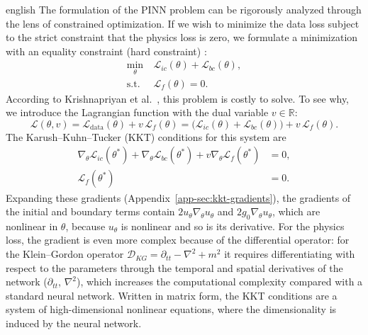 \documentclass[11pt,letterpaper,twoside,openright]{book} %
\newcommand{\Loss}{\mathcal{L}}
\begin{document}
\begin{hyphenrules}{english}
The formulation of the PINN problem can be rigorously analyzed through the lens of constrained
optimization. If we wish to minimize the data loss subject to the strict constraint that the physics
loss is zero, we formulate a minimization with an equality constraint (hard constraint)
\cite{krishnapriyan2021}:
\begin{align}
  \min_{\theta}\ &\Loss_{ic}(\theta)+\Loss_{bc}(\theta), \label{eq:hard-obj}\\
  \text{s.t. }\ &\Loss_f(\theta)=0. \label{eq:hard-constraint}
\end{align}
According to Krishnapriyan et al.~\cite{krishnapriyan2021}, this problem is costly to solve. To see why, we introduce the
Lagrangian function with the dual variable $v\in\mathbb{R}$:
\begin{equation}
  \mathscr{L}(\theta,v)=\Loss_{\mathrm{data}}(\theta)+v\,\Loss_f(\theta)
  =\big(\Loss_{ic}(\theta)+\Loss_{bc}(\theta)\big)+v\,\Loss_f(\theta).
  \label{eq:lagrangian}
\end{equation}
The Karush--Kuhn--Tucker (KKT) conditions for this system are \cite{boyd2004}
\begin{align}
  \nabla_\theta\Loss_{ic}(\theta^{*})+\nabla_\theta\Loss_{bc}(\theta^{*})+v\nabla_\theta\Loss_f(\theta^{*})&=0, \label{eq:kkt-1}\\
  \Loss_f(\theta^{*})&=0. \label{eq:kkt-2}
\end{align}
Expanding these gradients (Appendix~\ref{app-sec:kkt-gradients}), the gradients of the initial and boundary
terms contain $2u_\theta\nabla_\theta u_\theta$ and $2g_0\nabla_\theta u_\theta$, which are nonlinear in
$\theta$, because $u_\theta$ is nonlinear and so is its derivative. For the physics loss, the gradient is
even more complex because of the differential operator: for the Klein--Gordon operator
$\mathcal{D}_{KG}=\partial_{tt}-\nabla^2+m^2$ it requires differentiating with respect to the parameters
through the temporal and spatial derivatives of the network ($\partial_{tt}$, $\nabla^2$), which increases
the computational complexity compared with a standard neural network. Written in matrix form, the KKT
conditions are a system of high-dimensional nonlinear equations, where the dimensionality is induced by
the neural network.


\end{hyphenrules}
\end{document}
